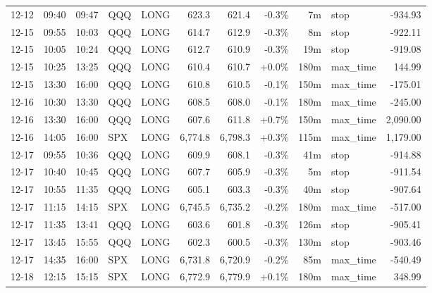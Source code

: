 \documentclass[11pt,a4paper,twoside]{article}
\begin{document}
\begin{center}
\begin{longtable}{>{\color{txtmain}}l l l l l r r r r >{\color{txtmain}}l r}
12-12 & 09:40 & 09:47 & QQQ & LONG & 623.3 & 621.4 & \textcolor{lossred}{-0.3\%} & 7m & stop & \textcolor{lossred}{-934.93} \\
12-15 & 09:55 & 10:03 & QQQ & LONG & 614.7 & 612.9 & \textcolor{lossred}{-0.3\%} & 8m & stop & \textcolor{lossred}{-922.11} \\
12-15 & 10:05 & 10:24 & QQQ & LONG & 612.7 & 610.9 & \textcolor{lossred}{-0.3\%} & 19m & stop & \textcolor{lossred}{-919.08} \\
12-15 & 10:25 & 13:25 & QQQ & LONG & 610.4 & 610.7 & \textcolor{wingreen}{+0.0\%} & 180m & max\_time & \textcolor{wingreen}{144.99} \\
12-15 & 13:30 & 16:00 & QQQ & LONG & 610.8 & 610.5 & \textcolor{lossred}{-0.1\%} & 150m & max\_time & \textcolor{lossred}{-175.01} \\
12-16 & 10:30 & 13:30 & QQQ & LONG & 608.5 & 608.0 & \textcolor{lossred}{-0.1\%} & 180m & max\_time & \textcolor{lossred}{-245.00} \\
12-16 & 13:30 & 16:00 & QQQ & LONG & 607.6 & 611.8 & \textcolor{wingreen}{+0.7\%} & 150m & max\_time & \textcolor{wingreen}{2,090.00} \\
12-16 & 14:05 & 16:00 & SPX & LONG & 6,774.8 & 6,798.3 & \textcolor{wingreen}{+0.3\%} & 115m & max\_time & \textcolor{wingreen}{1,179.00} \\
12-17 & 09:55 & 10:36 & QQQ & LONG & 609.9 & 608.1 & \textcolor{lossred}{-0.3\%} & 41m & stop & \textcolor{lossred}{-914.88} \\
12-17 & 10:40 & 10:45 & QQQ & LONG & 607.7 & 605.9 & \textcolor{lossred}{-0.3\%} & 5m & stop & \textcolor{lossred}{-911.54} \\
12-17 & 10:55 & 11:35 & QQQ & LONG & 605.1 & 603.3 & \textcolor{lossred}{-0.3\%} & 40m & stop & \textcolor{lossred}{-907.64} \\
12-17 & 11:15 & 14:15 & SPX & LONG & 6,745.5 & 6,735.2 & \textcolor{lossred}{-0.2\%} & 180m & max\_time & \textcolor{lossred}{-517.00} \\
12-17 & 11:35 & 13:41 & QQQ & LONG & 603.6 & 601.8 & \textcolor{lossred}{-0.3\%} & 126m & stop & \textcolor{lossred}{-905.41} \\
12-17 & 13:45 & 15:55 & QQQ & LONG & 602.3 & 600.5 & \textcolor{lossred}{-0.3\%} & 130m & stop & \textcolor{lossred}{-903.46} \\
12-17 & 14:35 & 16:00 & SPX & LONG & 6,731.8 & 6,720.9 & \textcolor{lossred}{-0.2\%} & 85m & max\_time & \textcolor{lossred}{-540.49} \\
12-18 & 12:15 & 15:15 & SPX & LONG & 6,772.9 & 6,779.9 & \textcolor{wingreen}{+0.1\%} & 180m & max\_time & \textcolor{wingreen}{348.99} \\

\end{longtable}
\end{center}
\end{document}
